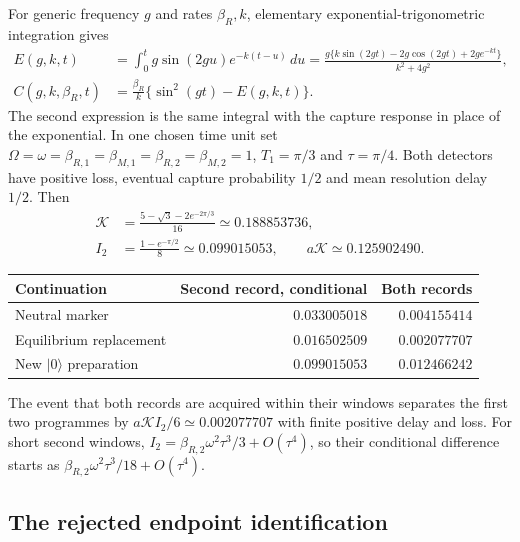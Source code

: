 \documentclass[11pt,oneside,openany]{book}
\theoremstyle{definition}
\theoremstyle{remark}\newtheorem{remark}[theorem]{Remark}
\begin{document}
For generic frequency $g$ and rates $\beta_R,k$, elementary
exponential-trigonometric integration gives
\begin{align}
 E(g,k,t)&=\int_0^t g\sin(2gu)e^{-k(t-u)}\,du
 =\frac{g\{k\sin(2gt)-2g\cos(2gt)+2ge^{-kt}\}}{k^2+4g^2},
 \nonumber\\
 C(g,k,\beta_R,t)&=\frac{\beta_R}{k}
                       \{\sin^2(gt)-E(g,k,t)\}.
 \label{bench:history-closed-integral}
\end{align}
The second expression is the same integral with the capture response
in place of the exponential. In one chosen time unit set
$\Omega=\omega=\beta_{R,1}=\beta_{M,1}=\beta_{R,2}=\beta_{M,2}=1$,
$T_1=\pi/3$ and $\tau=\pi/4$. Both detectors have positive loss,
eventual capture probability $1/2$ and mean resolution delay $1/2$.
Then
\[
 \begin{aligned}
 \mathcal K&=\frac{5-\sqrt3-2e^{-2\pi/3}}{16}
            \simeq0.188853736,\\
 I_2&=\frac{1-e^{-\pi/2}}8\simeq0.099015053,
 \qquad a\mathcal K\simeq0.125902490.
 \end{aligned}
\]
\begin{center}
\begin{tabular}{@{}lrr@{}}
\toprule
Continuation & Second record, conditional & Both records\\
\midrule
Neutral marker & $0.033005018$ & $0.004155414$\\
Equilibrium replacement & $0.016502509$ & $0.002077707$\\
New $|0\rangle$ preparation & $0.099015053$ & $0.012466242$\\
\bottomrule
\end{tabular}
\end{center}
The event that both records are acquired within their windows
separates the first two programmes by
$a\mathcal K I_2/6\simeq0.002077707$ with finite positive delay and
loss. For short second windows,
$I_2=\beta_{R,2}\omega^2\tau^3/3+O(\tau^4)$, so their conditional
difference starts as $\beta_{R,2}\omega^2\tau^3/18+O(\tau^4)$.

\subsection{The rejected endpoint identification}
\end{document}
